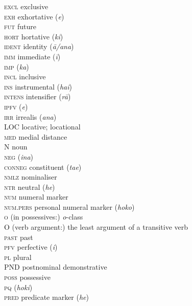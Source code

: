 \begin{tabbing}
{\scshape excl} \> exclusive\\
{\scshape exh} \> {exhortative (\textit{e})}\\
{\scshape fut} \> future\\
{\scshape hort} \> hortative (\textit{ki})\\
{\scshape ident} \> identity (\textit{{\ꞌ}ā/{\ꞌ}ana})\\
{\scshape imm} \> immediate (\textit{{\ꞌ}ī})\\
{\scshape imp} \> { (\textit{ka})}\\
{\scshape incl} \> inclusive\\
{\scshape ins} \> instrumental (\textit{hai})\\
{\scshape intens} \> intensifier (\textit{rā})\\
{\scshape ipfv} \>  (\textit{e})\\
{\scshape irr} \> irrealis (\textit{ana})\\
LOC \> locative; locational\\
{\scshape med} \> medial distance\\
N \> noun\\
{\scshape neg} \>  (\textit{{\ꞌ}ina})\\
{\scshape conneg} \> constituent  (\textit{ta{\ꞌ}e})\\
{\scshape nmlz} \> nominaliser\\
{\scshape ntr} \> neutral  (\textit{he})\\
{\scshape num} \> numeral marker\\
{\scshape num.pers} \> personal numeral marker (\textit{hoko})\\
\textsc{o} \> (in possessives:) \textit{o}{}-class \\
O \> (verb argument:) the least  argument of a transitive verb\\
{\scshape past} \> past\\
{\scshape pfv} \> perfective (\textit{i})\\
{\scshape pl} \> plural\\
PND \> {postnominal demonstrative}\\
{\scshape poss} \> possessive\\
{\scshape pq} \>  (\textit{hoki})\\
{\scshape pred} \> predicate marker (\textit{he})\\

\end{tabbing}
